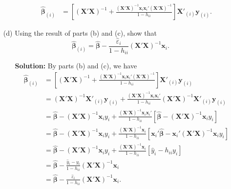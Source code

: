 \documentclass[11pt]{article}
\newcommand{\XX}{(\mathbf{X}'\mathbf{X})}
\begin{document}
\begin{itemize}
\begin{itemize}
\begin{align*}
\widehat{\bm\beta}_{(i)} &= \left[\XX^{-1} + \frac{\XX^{-1}\mathbf{x}_i\mathbf{x}_i'\XX^{-1}}{1-h_{ii}}\right]\mathbf{X}'_{(i)}\mathbf{y}_{(i)}.
\end{align*}
\end{itemize}
\item[(d)] Using the result of parts (b) and (c), show that
\[
\widehat{\bm\beta}_{(i)} = \widehat{\bm\beta} - \frac{\widehat{\varepsilon}_i}{1-h_{ii}}\XX^{-1}\mathbf{x}_i.
\]
\begin{itemize}
\item[] \textbf{Solution:}  By parts (b) and (c), we have
\begin{align*}
\widehat{\bm\beta}_{(i)} &= \left[\XX^{-1} + \frac{\XX^{-1}\mathbf{x}_i\mathbf{x}_i'\XX^{-1}}{1-h_{ii}}\right]\mathbf{X}'_{(i)}\mathbf{y}_{(i)} \\
&= \XX^{-1}\mathbf{X}'_{(i)}\mathbf{y}_{(i)} + \frac{\XX^{-1}\mathbf{x}_i\mathbf{x}_i'}{1-h_{ii}}\XX^{-1}\mathbf{X}'_{(i)}\mathbf{y}_{(i)} \\
&= \widehat{\bm\beta} - (\mathbf{X}'\mathbf{X})^{-1}\mathbf{x}_iy_i + \frac{\XX^{-1}\mathbf{x}_i\mathbf{x}_i'}{1-h_{ii}}\left[\widehat{\bm\beta} - (\mathbf{X}'\mathbf{X})^{-1}\mathbf{x}_iy_i\right] \\
&= \widehat{\bm\beta} - (\mathbf{X}'\mathbf{X})^{-1}\mathbf{x}_iy_i + \frac{\XX^{-1}\mathbf{x}_i}{1-h_{ii}}\left[\mathbf{x}_i'\widehat{\bm\beta} - \mathbf{x}_i'(\mathbf{X}'\mathbf{X})^{-1}\mathbf{x}_iy_i\right] \\
&= \widehat{\bm\beta} - (\mathbf{X}'\mathbf{X})^{-1}\mathbf{x}_iy_i + \frac{\XX^{-1}\mathbf{x}_i}{1-h_{ii}}\left[\widehat{y}_i - h_{ii}y_i\right] \\
&= \widehat{\bm\beta} - \frac{\widehat{y}_i - y_i}{1-h_{ii}}\XX^{-1}\mathbf{x}_i\\
&= \widehat{\bm\beta} - \frac{\widehat{\varepsilon}_i}{1-h_{ii}}\XX^{-1}\mathbf{x}_i.
\end{align*}
\end{itemize}
\end{itemize}
\end{document}
